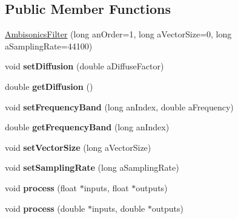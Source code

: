 \subsection*{Public Member Functions}
\begin{DoxyCompactItemize}
\item 
\hyperlink{class_ambisonics_filter_aeeafcaad4a5d3081d777c3e8bb03ed0c}{Ambisonics\-Filter} (long an\-Order=1, long a\-Vector\-Size=0, long a\-Sampling\-Rate=44100)
\item 
\hypertarget{class_ambisonics_filter_acdbc7e48c9e6d989c1dc103f386e5a3f}{void {\bfseries set\-Diffusion} (double a\-Diffuse\-Factor)}\label{class_ambisonics_filter_acdbc7e48c9e6d989c1dc103f386e5a3f}

\item 
\hypertarget{class_ambisonics_filter_acfb84d5862c9c9fe837d2786c10d21dd}{double {\bfseries get\-Diffusion} ()}\label{class_ambisonics_filter_acfb84d5862c9c9fe837d2786c10d21dd}

\item 
\hypertarget{class_ambisonics_filter_a223e952d03990b8c54131754a74e018c}{void {\bfseries set\-Frequency\-Band} (long an\-Index, double a\-Frequency)}\label{class_ambisonics_filter_a223e952d03990b8c54131754a74e018c}

\item 
\hypertarget{class_ambisonics_filter_a5e1196b6f8470a264edbe9dcb5072afe}{double {\bfseries get\-Frequency\-Band} (long an\-Index)}\label{class_ambisonics_filter_a5e1196b6f8470a264edbe9dcb5072afe}

\item 
\hypertarget{class_ambisonics_filter_a13b6286ca6514a6601245050f684f66f}{void {\bfseries set\-Vector\-Size} (long a\-Vector\-Size)}\label{class_ambisonics_filter_a13b6286ca6514a6601245050f684f66f}

\item 
\hypertarget{class_ambisonics_filter_ae671de830a2c29e0624de0c433622f5f}{void {\bfseries set\-Sampling\-Rate} (long a\-Sampling\-Rate)}\label{class_ambisonics_filter_ae671de830a2c29e0624de0c433622f5f}

\item 
\hypertarget{class_ambisonics_filter_abef4dd5c6a7a1e35a87191f31e0094c6}{void {\bfseries process} (float $\ast$inputs, float $\ast$outputs)}\label{class_ambisonics_filter_abef4dd5c6a7a1e35a87191f31e0094c6}

\item 
\hypertarget{class_ambisonics_filter_a2357b427c1838b0eb287be4afdab955c}{void {\bfseries process} (double $\ast$inputs, double $\ast$outputs)}\label{class_ambisonics_filter_a2357b427c1838b0eb287be4afdab955c}


\end{DoxyCompactItemize}
